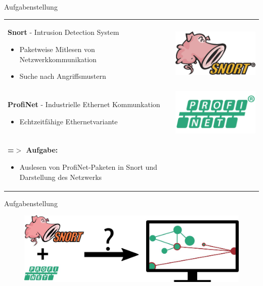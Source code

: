 \begin{frame}{Aufgabenstellung}
\begin{tabular}{m{8cm}r}
  \textbf{Snort} - Intrusion Detection System
    \begin{itemize}
      \item Paketweise Mitlesen von Netzwerkkommunikation
      \item Suche nach Angriffsmustern
    \end{itemize} & \includegraphics[width=0.2\linewidth]{images/max-snort} \\
  \pause
  \textbf{ProfiNet} - Industrielle Ethernet Kommunkation
    \begin{itemize}
      \item Echtzeitfähige Ethernetvariante
    \end{itemize} & \includegraphics[width=0.2\linewidth]{images/max-profinet} \\
  \pause
  \textbf{=$>$ Aufgabe:} 
  \begin{itemize} 
    \item Auslesen von ProfiNet-Paketen in Snort und Darstellung des Netzwerks
\end{itemize}
\end{tabular}
\end{frame}

\begin{frame}{Aufgabenstellung}
\begin{figure}
  \centering
  \includegraphics[width=\textwidth]{./images/aufgabestellung.jpg}
\end{figure}
\end{frame} 